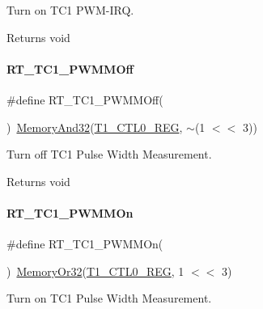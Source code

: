 Turn on T\+C1 P\+W\+M-\/\+I\+RQ. 

\begin{DoxyReturn}{Returns}
void 
\end{DoxyReturn}
\mbox{\label{a00080_aa070a043272a38ae84492146683a00d3}} 
\paragraph{\texorpdfstring{R\+T\+\_\+\+T\+C1\+\_\+\+P\+W\+M\+M\+Off}{RT\_TC1\_PWMMOff}}
{\footnotesize\ttfamily \#define R\+T\+\_\+\+T\+C1\+\_\+\+P\+W\+M\+M\+Off(\begin{DoxyParamCaption}{ }\end{DoxyParamCaption})~\mbox{\hyperlink{a00026_ad87cedffcaadc51db22594fce55173d4}{Memory\+And32}}(\mbox{\hyperlink{a00026_a55600694c3c73a1019f78d306f474fa1}{T1\+\_\+\+C\+T\+L0\+\_\+\+R\+EG}}, $\sim$(1 $<$$<$ 3))}



Turn off T\+C1 Pulse Width Measurement. 

\begin{DoxyReturn}{Returns}
void 
\end{DoxyReturn}
\mbox{\label{a00080_a6f11e47b5a8e7947fc76e9955e94acea}} 
\paragraph{\texorpdfstring{R\+T\+\_\+\+T\+C1\+\_\+\+P\+W\+M\+M\+On}{RT\_TC1\_PWMMOn}}
{\footnotesize\ttfamily \#define R\+T\+\_\+\+T\+C1\+\_\+\+P\+W\+M\+M\+On(\begin{DoxyParamCaption}{ }\end{DoxyParamCaption})~\mbox{\hyperlink{a00026_a27874a97deab7cecdde5ddecf466e31e}{Memory\+Or32}}(\mbox{\hyperlink{a00026_a55600694c3c73a1019f78d306f474fa1}{T1\+\_\+\+C\+T\+L0\+\_\+\+R\+EG}}, 1 $<$$<$ 3)}



Turn on T\+C1 Pulse Width Measurement. 

